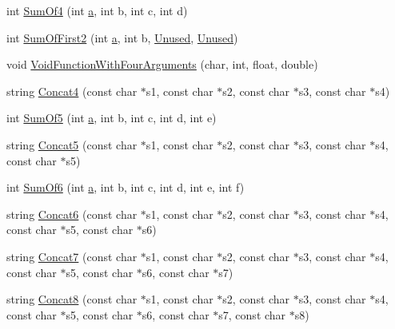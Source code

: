 \begin{DoxyCompactItemize}
\item 
int \hyperlink{namespacetesting_1_1gmock__more__actions__test_a41c348fff8608825239a276b8426a475}{Sum\+Of4} (int \hyperlink{_07copy_08_2_read_camera_model_8m_a551a3d351eadcc0b9b1a2f24f0fb5ea0}{a}, int b, int c, int d)
\item 
int \hyperlink{namespacetesting_1_1gmock__more__actions__test_aaa60ddffb96ddc3a73b0b22929ca5bec}{Sum\+Of\+First2} (int \hyperlink{_07copy_08_2_read_camera_model_8m_a551a3d351eadcc0b9b1a2f24f0fb5ea0}{a}, int b, \hyperlink{namespacetesting_a603e329ec0263ebfcf16f712810bd511}{Unused}, \hyperlink{namespacetesting_a603e329ec0263ebfcf16f712810bd511}{Unused})
\item 
void \hyperlink{namespacetesting_1_1gmock__more__actions__test_a8c952be61635486e84c1eca3bf3acd9b}{Void\+Function\+With\+Four\+Arguments} (char, int, float, double)
\item 
string \hyperlink{namespacetesting_1_1gmock__more__actions__test_aa423cedcbd858249b616f0c537a1e4cf}{Concat4} (const char $\ast$s1, const char $\ast$s2, const char $\ast$s3, const char $\ast$s4)
\item 
int \hyperlink{namespacetesting_1_1gmock__more__actions__test_a38e64569bf08e83c6db22c1fb0fe0af6}{Sum\+Of5} (int \hyperlink{_07copy_08_2_read_camera_model_8m_a551a3d351eadcc0b9b1a2f24f0fb5ea0}{a}, int b, int c, int d, int e)
\item 
string \hyperlink{namespacetesting_1_1gmock__more__actions__test_a2ac9917d1aa19cd7ac32bba837f4eacc}{Concat5} (const char $\ast$s1, const char $\ast$s2, const char $\ast$s3, const char $\ast$s4, const char $\ast$s5)
\item 
int \hyperlink{namespacetesting_1_1gmock__more__actions__test_a139632d344348fdfa25111d4e43f70ba}{Sum\+Of6} (int \hyperlink{_07copy_08_2_read_camera_model_8m_a551a3d351eadcc0b9b1a2f24f0fb5ea0}{a}, int b, int c, int d, int e, int f)
\item 
string \hyperlink{namespacetesting_1_1gmock__more__actions__test_a4de188277a85d007de0aa6e8dc364b75}{Concat6} (const char $\ast$s1, const char $\ast$s2, const char $\ast$s3, const char $\ast$s4, const char $\ast$s5, const char $\ast$s6)
\item 
string \hyperlink{namespacetesting_1_1gmock__more__actions__test_a5628f71ebb5ae61a6e56396145a76da4}{Concat7} (const char $\ast$s1, const char $\ast$s2, const char $\ast$s3, const char $\ast$s4, const char $\ast$s5, const char $\ast$s6, const char $\ast$s7)
\item 
string \hyperlink{namespacetesting_1_1gmock__more__actions__test_a122e4affe78745eef3dd748e88bd248c}{Concat8} (const char $\ast$s1, const char $\ast$s2, const char $\ast$s3, const char $\ast$s4, const char $\ast$s5, const char $\ast$s6, const char $\ast$s7, const char $\ast$s8)

\end{DoxyCompactItemize}
